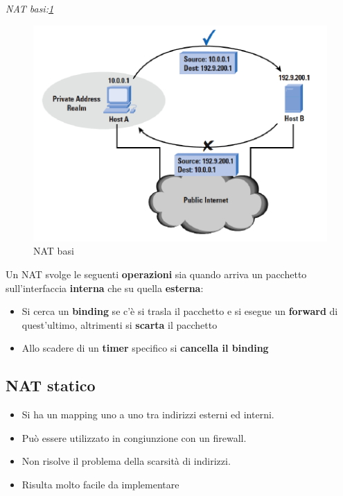 \documentclass[12pt]{article}
\begin{document}
			\textit{NAT basi:\ref{fig:6}}
			\begin{figure}[h!]
				\centering
				\includegraphics[scale=0.60]{img/basi.PNG}
				\caption{NAT basi\label{fig:6}}
			\end{figure}
		
			Un NAT svolge le seguenti \textbf{operazioni} sia quando arriva un pacchetto sull'interfaccia \textbf{interna} che su quella \textbf{esterna}:
			\begin{itemize}
				\item Si cerca un \textbf{binding} se c'è si trasla il pacchetto e si esegue un \textbf{forward} di quest'ultimo, altrimenti si \textbf{scarta} il pacchetto
				\item Allo scadere di un \textbf{timer} specifico si \textbf{cancella il binding}
			\end{itemize}
	
		\subsection{NAT statico}
			\begin{itemize}
				\item Si ha un mapping uno a uno tra indirizzi esterni ed interni.
				\item Può essere utilizzato in congiunzione con un firewall.
				\item Non risolve il problema della scarsità di indirizzi.
				\item Risulta molto facile da implementare	
			\end{itemize}
		
\end{document}
